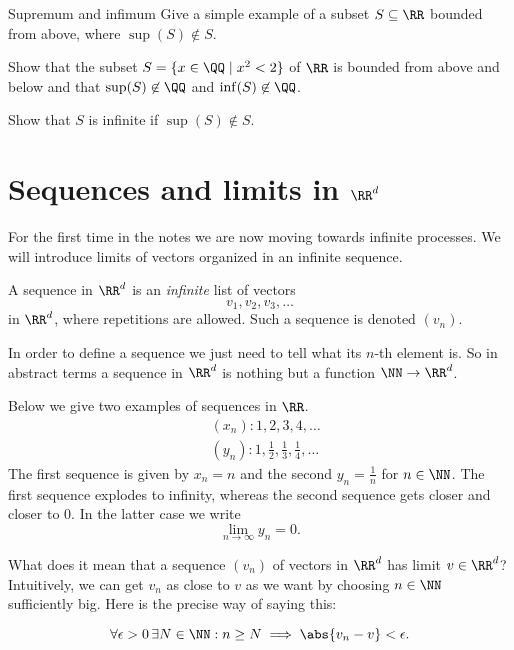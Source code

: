 \documentclass{article}
\begin{document}
\begin{hideinbutton}{Supremum and infimum}
\beginshex
Give a simple example of a subset $S\subseteq \RR$ bounded from above, where
$\sup(S)\not\in S$.

Show that the subset $S = \{x\in \QQ \mid x^2 < 2\}$ of $\RR$ is bounded from above and below and
  that $\sup(S)\not\in \QQ$ and $\inf(S)\not\in \QQ$.
\endshex

\beginshex
Show that $S$ is infinite if $\sup(S)\not\in S$.
\endshex

\end{hideinbutton}



  \section{Sequences and limits in $\RR^d$}

  For the first time in the notes we are now moving towards infinite
  processes. We will introduce limits
  of vectors organized in an infinite sequence.

\begin{definition}[emph]  
A sequence
in  $\RR^d$ is an \emph{infinite} list of vectors
$$
v_1, v_2, v_3, \dots
$$
in $\RR^d$, where repetitions are allowed. Such a sequence is denoted $(v_n)$.
\end{definition}

In order to define a sequence we just need to tell what its $n$-th element is. So
in abstract terms a sequence in $\RR^d$ is nothing but a function $\NN\rightarrow \RR^d$.

\begin{example}
Below we give two examples of sequences in $\RR$.
\begin{align*}
&(x_n): 1, 2, 3, 4, \dots\\
&(y_n): 1, \tfrac{1}{2}, \tfrac{1}{3}, \tfrac{1}{4}, \dots
\end{align*}
The first sequence is given by $x_n = n$ and the second $y_n = \frac{1}{n}$ for $n\in \NN$. The first sequence
explodes to infinity, whereas the second sequence gets closer and closer to $0$. In the latter case we
write
$$
\lim_{n\to\infty} y_n = 0.
$$
\end{example}

What does it mean that a sequence $(v_n)$ of vectors in $\RR^d$  has limit $v\in \RR^d$? Intuitively,
we can get $v_n$ as close to $v$ as we want by choosing
$n\in \NN$ sufficiently big. Here is the precise way of saying this:


\begin{equation}[emph]\label{convdef}
\forall \epsilon > 0\, \exists N\in \NN: n\geq N\implies \abs{v_n - v} < \epsilon.
\end{equation}
\end{document}
